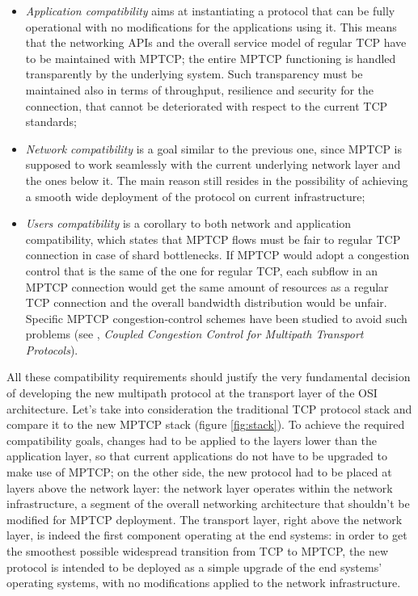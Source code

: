 \begin{itemize}
  \item \textit{Application compatibility} aims at instantiating a protocol that can be fully operational with no modifications for the applications using it. This means that the networking APIs and the overall service model of regular TCP have to be maintained with MPTCP; the entire MPTCP functioning is handled transparently by the underlying system. Such transparency must be maintained also in terms of throughput, resilience and security for the connection, that cannot be deteriorated with respect to the current TCP standards;
  \item \textit{Network compatibility} is a goal similar to the previous one, since MPTCP is supposed to work seamlessly with the current underlying network layer and the ones below it. The main reason still resides in the possibility of achieving a smooth wide deployment of the protocol on current infrastructure;
  \item \textit{Users compatibility} is a corollary to both network and application compatibility, which states that MPTCP flows must be fair to regular TCP connection in case of shard bottlenecks. If MPTCP would adopt a congestion control that is the same of the one for regular TCP, each subflow in an MPTCP connection would get the same amount of resources as a regular TCP connection and the overall bandwidth distribution would be unfair. Specific MPTCP congestion-control schemes have been studied to avoid such problems (see , \textit{Coupled Congestion Control for Multipath Transport Protocols}).
\end{itemize}

All these compatibility requirements should justify the very fundamental decision of developing the new multipath protocol at the transport layer of the OSI architecture. Let's take into consideration the traditional TCP protocol stack and compare it to the new MPTCP stack (figure \ref{fig:stack}).
To achieve the required compatibility goals, changes had to be applied to the layers lower than the application layer, so that current applications do not have to be upgraded to make use of MPTCP; on the other side, the new protocol had to be placed at layers above the network layer: the network layer operates within the network infrastructure, a segment of the overall networking architecture that shouldn't be modified for MPTCP deployment. The transport layer, right above the network layer, is indeed the first component operating at the end systems: in order to get the smoothest possible widespread transition from TCP to MPTCP, the new protocol is intended to be deployed as a simple upgrade of the end systems' operating systems, with no modifications applied to the network infrastructure.

